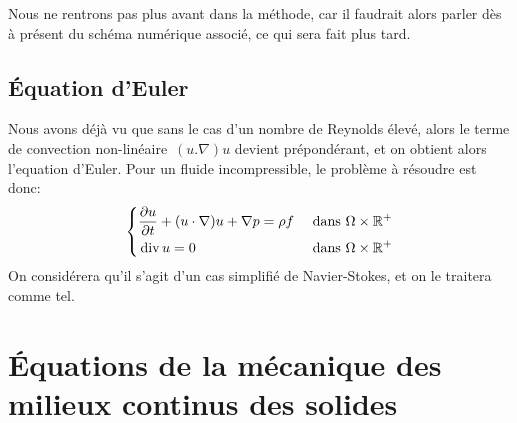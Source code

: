 Nous ne rentrons pas plus avant dans la méthode, car il faudrait alors parler dès à présent
du schéma numérique associé, ce qui sera fait plus tard.

\medskip
\subsection{Équation d'Euler}
Nous avons déjà vu que sans le cas d'un nombre de Reynolds
élevé, alors le terme de convection non-linéaire~$(u.\nabla)u$ devient prépondérant,
et on obtient alors l'equation d'Euler.
Pour un fluide incompressible, le problème à résoudre est donc:
\begin{equation}\left\{
\begin{aligned}
&\dfrac{\partial u}{\partial t} + (u\cdot\nabla) u + \nabla p = \rho f && \text{ dans } \Omega\times\mathbb R^+\\
&\operatorname{div} u = 0&& \text{ dans } \Omega\times\mathbb R^+
\end{aligned}\right.
\end{equation}
On considérera qu'il s'agit d'un cas simplifié de Navier-Stokes, et on le traitera
comme tel.

\medskip
\section{Équations de la mécanique des milieux continus des solides}
\medskip
